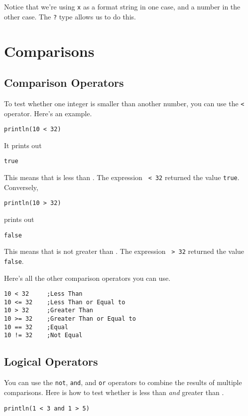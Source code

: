 \documentclass[10pt,oneside]{book}
\begin{document}
Notice that we're using \texttt{\frenchspacing x} as a format string in one case, and a number in the other case. The \texttt{\frenchspacing ?} type allows us to do this.

\section{Comparisons}

\subsection*{Comparison Operators}
To test whether one integer is smaller than another number, you can use the \texttt{\frenchspacing <} operator. Here's an example.
\begin{lstlisting}
println(10 < 32)
\end{lstlisting}
It prints out
\begin{lstlisting}
true
\end{lstlisting}
This means that \texttt{} is less than \texttt{}. The expression \texttt{ < 32} returned the value \texttt{\frenchspacing true}. Conversely, 

\begin{lstlisting}
println(10 > 32)
\end{lstlisting}
prints out
\begin{lstlisting}
false
\end{lstlisting}
This means that \texttt{} is not greater than \texttt{}. The expression \texttt{ > 32} returned the value \texttt{\frenchspacing false}. 

Here's all the other comparison operators you can use.
\begin{lstlisting}
10 < 32     ;Less Than
10 <= 32    ;Less Than or Equal to
10 > 32     ;Greater Than
10 >= 32    ;Greater Than or Equal to
10 == 32    ;Equal
10 != 32    ;Not Equal
\end{lstlisting}

\subsection*{Logical Operators}
You can use the \texttt{\frenchspacing not}, \texttt{\frenchspacing and}, and \texttt{\frenchspacing or} operators to combine the results of multiple comparisons. Here is how to test whether \texttt{} is less than \texttt{} {\em and} greater than \texttt{}.
\begin{lstlisting}
println(1 < 3 and 1 > 5)
\end{lstlisting}
\end{document}
